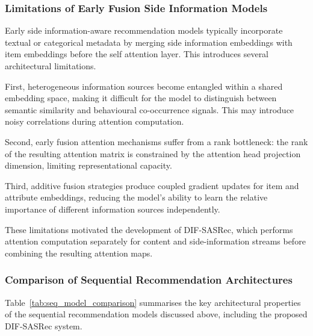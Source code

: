 \subsubsection{Limitations of Early Fusion Side Information Models}

Early side information-aware recommendation models typically incorporate textual or categorical metadata by merging side information embeddings with item embeddings before the self attention layer. This introduces several architectural limitations.

First, heterogeneous information sources become entangled within a shared embedding space, making it difficult for the model to distinguish between semantic similarity and behavioural co-occurrence signals. This may introduce noisy correlations during attention computation.

Second, early fusion attention mechanisms suffer from a rank bottleneck: the rank of the resulting attention matrix is constrained by the attention head projection dimension, limiting representational capacity.

Third, additive fusion strategies produce coupled gradient updates for item and attribute embeddings, reducing the model’s ability to learn the relative importance of different information sources independently.

These limitations motivated the development of DIF-SASRec, which performs attention computation separately for content and side-information streams before combining the resulting attention maps.

\subsubsection{Comparison of Sequential Recommendation Architectures}
\label{sec:seq_model_comparison}

Table~\ref{tab:seq_model_comparison} summarises the key architectural properties of the sequential recommendation models discussed above, including the proposed DIF-SASRec system.

